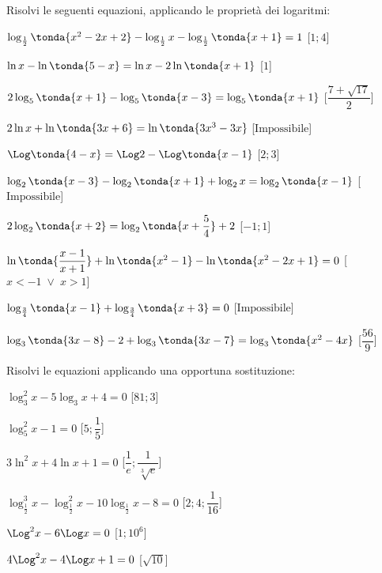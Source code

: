 \begin{esercizio}\label{ese:}
 Risolvi le seguenti equazioni, applicando le proprietà dei logaritmi:
 \begin{enumeratea}
   \item \(\log_{\frac{1}{2}} \tonda{x^2-2x+2}-\log_{\frac{1}{2}} x- 
\log_{\frac{1}{2}} \tonda{x+1}=1\)
   \hfill [\(1;4\)]
   \item \(\ln x-\ln \tonda{5-x}=\ln x-2\ln  \tonda{x+1}\)
   \hfill [\(1\)]
   \item \(2 \log_5 \tonda{x+1}-\log_5 \tonda{x-3} = \log_5 \tonda{x+1}\)
   \hfill [\(\dfrac{7+\sqrt{17}}{2}\)]
   \item \(2 \ln x+\ln \tonda{3x+6}=\ln \tonda{3x^3-3x}\)
   \hfill [\(\text{Impossibile}\)]
   \item \(\Log \tonda{4-x}=\Log 2 -\Log \tonda{x-1}\)
   \hfill [\(2 ;3\)]
   \item \(\log_2 \tonda{x-3} -\log_2 \tonda{x+1}+\log_2 x = \log_2 
\tonda{x-1}\)
   \hfill [\(\text{Impossibile}\)]
   \item \(2 \log_2 \tonda{x+2}=\log_2 \tonda{x+\dfrac{5}{4}}+2\)
   \hfill [\(-1;1\)]
   \item \(\ln \tonda{\dfrac{x-1}{x+1}}+\ln \tonda{x^2-1}-\ln 
\tonda{x^2-2x+1}=0\)
   \hfill [\(x<-1 \;\lor\; x>1\)]
   \item \(\log_{\frac{3}{4}} 
\tonda{x-1}+\log_{\frac{3}{4}}\tonda{x+3}=0\)
   \hfill [\(\text{Impossibile}\)]
   \item \(\log_3 \tonda{3x-8}-2+\log_3 \tonda{3x-7}=\log_3 \tonda{x^2-4x}\)
   \hfill [\(\dfrac{56}{9}\)]
 \end{enumeratea}
\end{esercizio}

\begin{esercizio}\label{ese:}
 Risolvi le equazioni applicando una opportuna sostituzione:
 \begin{enumeratea}
  \item  \(\log_3^2 x-5 \log_3 x+4=0\)
   \hfill [\(81;3\)]
  \item  \(\log_5^2 x-1=0\)
   \hfill [\(5;\dfrac{1}{5}\)]
   \item  \(3\ln^2 x+4 \ln x+1=0\)
   \hfill [\(\dfrac{1}{e};\dfrac{1}{\sqrt[3]{e}}\)]
   \item  \(\log_{\frac{1}{2}}^3 x-\log_{\frac{1}{2}}^2 
x-10\log_{\frac{1}{2}} x-8=0\)
   \hfill [\(2;4;\dfrac{1}{16}\)]
   \item  \(\Log^2 x-6\Log x=0\)
   \hfill [\(1;10^6\)]
   \item  \(4 \Log^2 x-4\Log x+1=0\)
   \hfill [\(\sqrt{10}\)]
 \end{enumeratea}
\end{esercizio}

